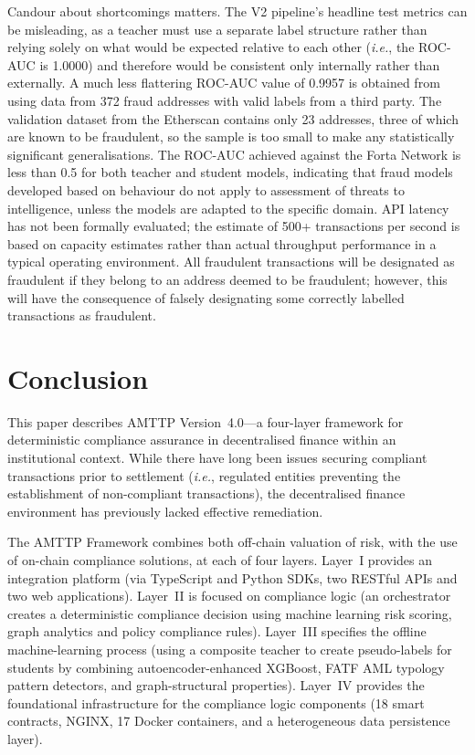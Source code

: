 \documentclass[journal]{IEEEtran}
\newcommand{\ie}{\textit{i.e.}}
\begin{document}
Candour about shortcomings matters. The V2 pipeline's headline test metrics can be misleading, as a teacher must use a separate label structure rather than relying solely on what would be expected relative to each other (\ie, the ROC-AUC is 1.0000) and therefore would be consistent only internally rather than externally. A much less flattering ROC-AUC value of 0.9957 is obtained from using data from 372 fraud addresses with valid labels from a third party. The validation dataset from the Etherscan contains only 23 addresses, three of which are known to be fraudulent, so the sample is too small to make any statistically significant generalisations. The ROC-AUC achieved against the Forta Network is less than 0.5 for both teacher and student models, indicating that fraud models developed based on behaviour do not apply to assessment of threats to intelligence, unless the models are adapted to the specific domain. API latency has not been formally evaluated; the estimate of 500+ transactions per second is based on capacity estimates rather than actual throughput performance in a typical operating environment. All fraudulent transactions will be designated as fraudulent if they belong to an address deemed to be fraudulent; however, this will have the consequence of falsely designating some correctly labelled transactions as fraudulent.

\section{Conclusion}

This paper describes AMTTP Version~4.0---a four-layer framework for deterministic compliance assurance in decentralised finance within an institutional context. While there have long been issues securing compliant transactions prior to settlement (\ie, regulated entities preventing the establishment of non-compliant transactions), the decentralised finance environment has previously lacked effective remediation.

The AMTTP Framework combines both off-chain valuation of risk, with the use of on-chain compliance solutions, at each of four layers. Layer~I provides an integration platform (via TypeScript and Python SDKs, two RESTful APIs and two web applications). Layer~II is focused on compliance logic (an orchestrator creates a deterministic compliance decision using machine learning risk scoring, graph analytics and policy compliance rules). Layer~III specifies the offline machine-learning process (using a composite teacher to create pseudo-labels for students by combining autoencoder-enhanced XGBoost, FATF AML typology pattern detectors, and graph-structural properties). Layer~IV provides the foundational infrastructure for the compliance logic components (18 smart contracts, NGINX, 17 Docker containers, and a heterogeneous data persistence layer).
\end{document}
